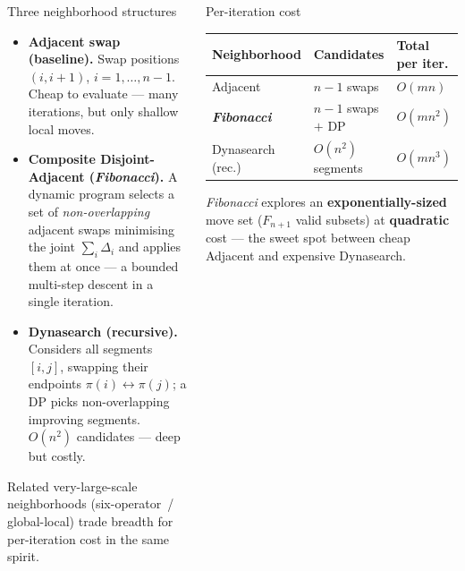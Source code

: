 \documentclass[final]{beamer}
\begin{document}
\begin{frame}
{\begin{columns}
\begin{block}{Three neighborhood structures}
\vspace*{2mm}
\begin{itemize}
  \item \textbf{Adjacent swap (baseline).} Swap positions $(i,i{+}1)$,
    $i=1,\dots,n{-}1$. Cheap to evaluate --- many iterations, but only
    shallow local moves.
  \item \textbf{Composite Disjoint-Adjacent (\emph{Fibonacci}).}
    A dynamic program selects a set of \emph{non-overlapping} adjacent
    swaps minimising the joint $\sum_i\Delta_i$ and applies them at once
    --- a bounded multi-step descent in a single iteration.
  \item \textbf{Dynasearch (recursive).} Considers all segments $[i,j]$,
    swapping their endpoints $\pi(i)\leftrightarrow\pi(j)$; a DP picks
    non-overlapping improving segments. $O(n^2)$ candidates --- deep but
    costly.
\end{itemize}
\vspace*{1mm}
Related very-large-scale neighborhoods (six-operator~/ global-local)
trade breadth for per-iteration cost in the same spirit.
\vspace*{2mm}
\end{block}

\vfill

\begin{block}{Per-iteration cost}
\vspace*{2mm}
\begin{center}
\begin{tabular}{lll}
\toprule
\textbf{Neighborhood} & \textbf{Candidates} & \textbf{Total per iter.} \\
\midrule
Adjacent                  & $n-1$ swaps        & $O(mn)$   \\
\textbf{\emph{Fibonacci}} & $n-1$ swaps $+$ DP & $O(mn^2)$ \\
Dynasearch (rec.)         & $O(n^2)$ segments  & $O(mn^3)$ \\
\bottomrule
\end{tabular}
\end{center}
\vspace*{2mm}
\emph{Fibonacci} explores an \textbf{exponentially-sized} move set
($F_{n+1}$ valid subsets) at \textbf{quadratic} cost --- the sweet spot
between cheap Adjacent and expensive Dynasearch.
\vspace*{2mm}
\end{block}



\end{columns}}
\end{frame}
\end{document}

